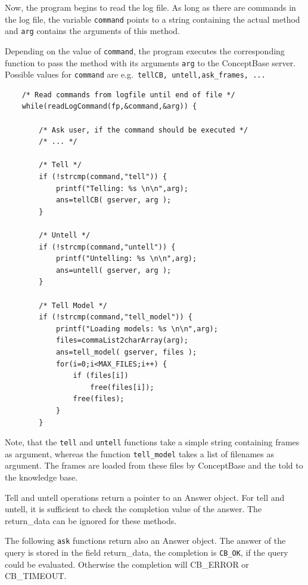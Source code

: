 Now, the program begins to read the log file. As long as there are
commands in the log file, the variable {\tt command} points to a string
containing the actual method and {\tt arg} contains the arguments of
this method.

Depending on the value of {\tt command}, the program executes
the corresponding function to pass the method with its arguments {\tt arg}
to the ConceptBase server. Possible values for {\tt command} are
e.g.\ {\tt tellCB, untell,ask\_frames, ...}

\begin{verbatim}
    /* Read commands from logfile until end of file */
    while(readLogCommand(fp,&command,&arg)) {

        /* Ask user, if the command should be executed */
        /* ... */

        /* Tell */
        if (!strcmp(command,"tell")) {
            printf("Telling: %s \n\n",arg);
            ans=tellCB( gserver, arg );
        }

        /* Untell */
        if (!strcmp(command,"untell")) {
            printf("Untelling: %s \n\n",arg);
            ans=untell( gserver, arg );
        }

        /* Tell Model */
        if (!strcmp(command,"tell_model")) {
            printf("Loading models: %s \n\n",arg);
            files=commaList2charArray(arg);
            ans=tell_model( gserver, files );
            for(i=0;i<MAX_FILES;i++) {
                if (files[i])
                    free(files[i]);
                free(files);
            }
        }
\end{verbatim}
Note, that the {\tt tell} and {\tt untell} functions take a simple string
containing frames as argument, whereas the function {\tt tell\_model}
takes a list of filenames as argument. The frames are loaded from these
files by ConceptBase and the told to the knowledge base.

Tell and untell operations return a pointer to an {\ttfamily Answer} object.
For tell and untell, it is sufficient to check the completion value of the answer.
The {\ttfamily return\_data} can be ignored for these methods.

The following {\tt ask} functions return also an {\ttfamily Answer} object.
The answer of the query is stored in the field {\ttfamily return\_data}, the
completion is {\tt CB\_OK}, if the query could be evaluated. Otherwise
the completion will {\ttfamily CB\_ERROR} or {\ttfamily CB\_TIMEOUT}.

